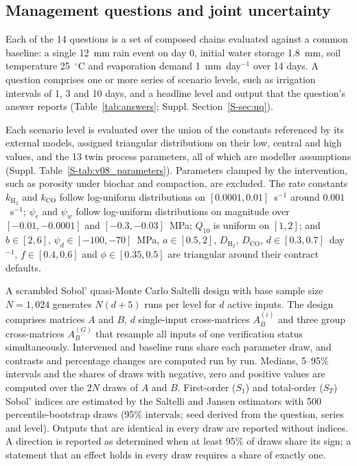 \documentclass[11pt,a4paper]{article}
\begin{document}
\subsection{Management questions and joint uncertainty}
Each of the 14 questions is a set of composed chains evaluated against a common baseline: a single 12~mm rain event on day 0, initial water storage 1.8~mm, soil temperature 25~$^\circ$C and evaporation demand 1~mm~day$^{-1}$ over 14 days. A question comprises one or more series of scenario levels, such as irrigation intervals of 1, 3 and 10 days, and a headline level and output that the question's answer reports (Table~\ref{tab:answers}; Suppl. Section~\ref{S-sec:uq}).

Each scenario level is evaluated over the union of the constants referenced by its external models, assigned triangular distributions on their low, central and high values, and the 13 twin process parameters, all of which are modeller assumptions (Suppl. Table~\ref{S-tab:v08_parameters}). Parameters clamped by the intervention, such as porosity under biochar and compaction, are excluded. The rate constants $k_{\mathrm{H_2}}$ and $k_{\mathrm{CO}}$ follow log-uniform distributions on $[0.0001,0.01]$~s$^{-1}$ around $0.001$~s$^{-1}$; $\psi_e$ and $\psi_w$ follow log-uniform distributions on magnitude over $[-0.01,-0.0001]$ and $[-0.3,-0.03]$~MPa; $Q_{10}$ is uniform on $[1,2]$; and $b\in[2,6]$, $\psi_d\in[-100,-70]$~MPa, $a\in[0.5,2]$, $D_{\mathrm{H_2}}$, $D_{\mathrm{CO}}$, $d\in[0.3,0.7]$~day$^{-1}$, $f\in[0.4,0.6]$ and $\phi\in[0.35,0.5]$ are triangular around their contract defaults.

A scrambled Sobol' quasi-Monte Carlo Saltelli design with base sample size $N=1,024$ generates $N(d+5)$ runs per level for $d$ active inputs. The design comprises matrices $A$ and $B$, $d$ single-input cross-matrices $A_B^{(i)}$ and three group cross-matrices $A_B^{(G)}$ that resample all inputs of one verification status simultaneously. Intervened and baseline runs share each parameter draw, and contrasts and percentage changes are computed run by run. Medians, 5--95\% intervals and the shares of draws with negative, zero and positive values are computed over the $2N$ draws of $A$ and $B$. First-order ($S_1$) and total-order ($S_T$) Sobol' indices are estimated by the Saltelli and Jansen estimators \cite{saltelli2010variance,jansen1999analysis} with 500 percentile-bootstrap draws (95\% intervals; seed derived from the question, series and level). Outputs that are identical in every draw are reported without indices. A direction is reported as determined when at least 95\% of draws share its sign; a statement that an effect holds in every draw requires a share of exactly one.
\end{document}
